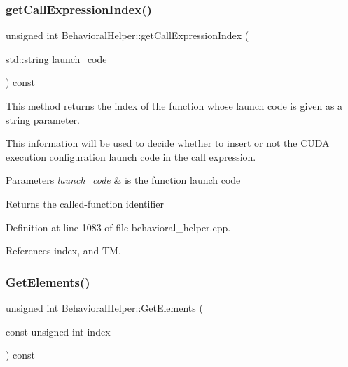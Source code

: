 \mbox{\label{classBehavioralHelper_a17cc11d87181726827e9dcd5682daf96}} 
\subsubsection{\texorpdfstring{get\+Call\+Expression\+Index()}{getCallExpressionIndex()}}
{\footnotesize\ttfamily unsigned int Behavioral\+Helper\+::get\+Call\+Expression\+Index (\begin{DoxyParamCaption}\item[{std\+::string}]{launch\+\_\+code }\end{DoxyParamCaption}) const\hspace{0.3cm}{\ttfamily [virtual]}}



This method returns the index of the function whose launch code is given as a string parameter. 

This information will be used to decide whether to insert or not the C\+U\+DA execution configuration launch code in the call expression. 
\begin{DoxyParams}{Parameters}
{\em launch\+\_\+code} & is the function launch code \\
\hline
\end{DoxyParams}
\begin{DoxyReturn}{Returns}
the called-\/function identifier 
\end{DoxyReturn}


Definition at line 1083 of file behavioral\+\_\+helper.\+cpp.



References index, and TM.

\mbox{\label{classBehavioralHelper_a2966a26651cad6597705927691d8af6e}} 
\subsubsection{\texorpdfstring{Get\+Elements()}{GetElements()}}
{\footnotesize\ttfamily unsigned int Behavioral\+Helper\+::\+Get\+Elements (\begin{DoxyParamCaption}\item[{const unsigned int}]{index }\end{DoxyParamCaption}) const}



